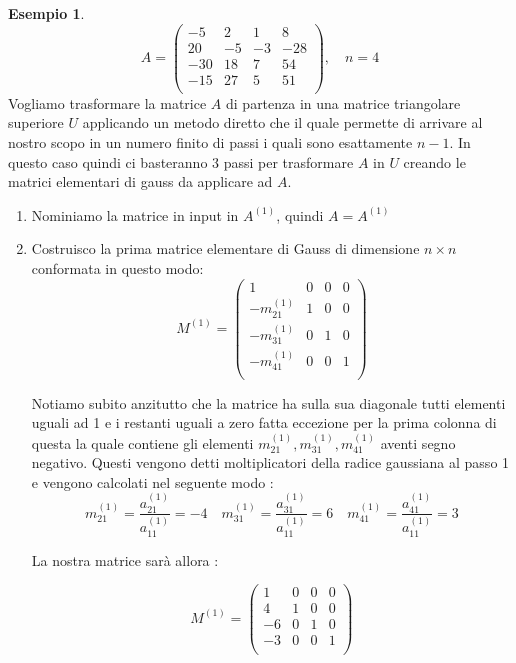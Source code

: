 \documentclass[12pt, a4paper]{book}
\theoremstyle{definition}
\newtheorem{exmp}{Esempio}[section]
\begin{document}
\begin{flushleft}
\begin{exmp}
\[
	A = 
	\begin{pmatrix}
		-5 & 2 & 1 & 8 \\
		20 & -5 & -3 & -28 \\
		-30 & 18 & 7 & 54 \\
		-15 & 27 & 5 & 51 \\
	\end{pmatrix}
	,	
	\quad
	n = 4
\]
Vogliamo trasformare la matrice $A$ di partenza in una matrice triangolare superiore $U$ applicando un metodo diretto che il quale permette di arrivare al nostro scopo in un numero finito di passi i quali sono esattamente $n-1$.
In questo caso quindi ci basteranno 3 passi per trasformare $A$ in $U$ creando le matrici elementari di gauss da applicare ad $A$.

\begin{enumerate}
	\item Nominiamo la matrice in input in $A^{(1)}$, quindi $A = A^{(1)}$
	\item Costruisco la prima matrice elementare di Gauss di dimensione $n \times n$ conformata in questo modo:
	\[
			M^{(1)} = 
				\begin{pmatrix}
					1 & 0 & 0 & 0 \\
					-m^{(1)}_{21} & 1 & 0 &0 \\
					-m^{(1)}_{31} & 0 & 1 & 0\\
					-m^{(1)}_{41} & 0 & 0 & 1 \\
				\end{pmatrix}
	\]
	
 	Notiamo subito anzitutto che la matrice ha sulla sua diagonale tutti elementi uguali ad 1 e i restanti uguali a zero fatta eccezione per la prima colonna di questa la quale contiene gli elementi $m^{(1)}_{21},m^{(1)}_{31},m^{(1)}_{41}$ aventi segno negativo.
 Questi vengono detti moltiplicatori della radice gaussiana al passo 1 e vengono calcolati nel seguente modo : 
 \[ 
		m^{(1)}_{21} = \frac{a^{(1)}_{21}}{a^{(1)}_{11}} = -4 \quad 	m^{(1)}_{31} = \frac{a^{(1)}_{31}}{a^{(1)}_{11}} = 6 \quad m^{(1)}_{41} = \frac{a^{(1)}_{41}}{a^{(1)}_{11}} = 3
 \]
 
 La nostra matrice sarà allora : 
 
 	\[
			M^{(1)} = 
				\begin{pmatrix}
					1 & 0 & 0 & 0 \\
					4 & 1 & 0 &0 \\
					-6& 0 & 1 & 0\\
					-3 & 0 & 0 & 1 \\
				\end{pmatrix}
	\]
	

\end{enumerate}
\end{exmp}
\end{flushleft}
\end{document}
